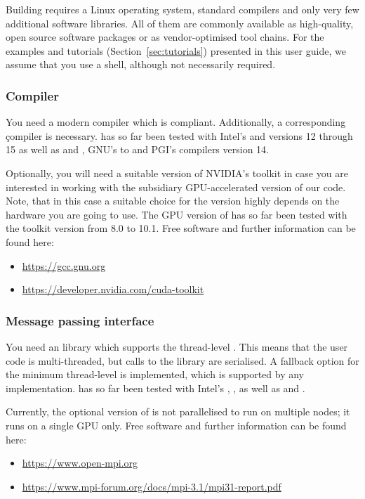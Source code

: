 \documentclass[a4paper, 11pt, DIV=11]{scrartcl}
\begin{document}
Building \nsc requires a Linux operating system, standard compilers and only
very few additional software libraries. All of them are commonly available as
high-quality, open source software packages or as vendor-optimised tool chains.
For the examples and tutorials (Section~\ref{sec:tutorials}) presented in this user
guide, we assume that you use a  shell, although not necessarily 
required.

\subsubsection{Compiler}
\label{sec:compiler}

You need a modern \fortran compiler which is 
\href{https://en.wikipedia.org/wiki/OpenMP}{} compliant.
Additionally, a corresponding \c compiler is necessary. \nsc has so far been 
tested with Intel's  and  versions 12 through 15 as well as
 and , GNU's  to  and 
PGI's compilers version 14.
\par
Optionally, you will need a suitable version of NVIDIA's \cuda toolkit in case
you are interested in working with the subsidiary GPU-accelerated version of our 
code. Note, that in this case a suitable choice for the \cuda version highly 
depends on the hardware you are going to use. The GPU version of \nsc has so 
far been tested with the \cuda toolkit version from 8.0 to 10.1. Free software
and further information can be found here:
\begin{itemize}
\item \url{https://gcc.gnu.org}
\item \url{https://developer.nvidia.com/cuda-toolkit}
\end{itemize}

\subsubsection{Message passing interface}
\label{sec:mpi}

You need an \mpi library which supports the thread-level .
This means that the user code is multi-threaded, but calls to the \mpi library are
serialised. A fallback option for the minimum thread-level is implemented, which is
supported by any \mpi implementation. \nsc has so far been tested with Intel's
, ,  as well as  and .
\par
Currently, the optional \cuda version of \nsc is not parallelised to run on multiple
nodes; it runs on a single GPU only. Free software and further information can be found
here:
\begin{itemize}
\item \url{https://www.open-mpi.org}
\item \url{https://www.mpi-forum.org/docs/mpi-3.1/mpi31-report.pdf}
\end{itemize}
\end{document}
